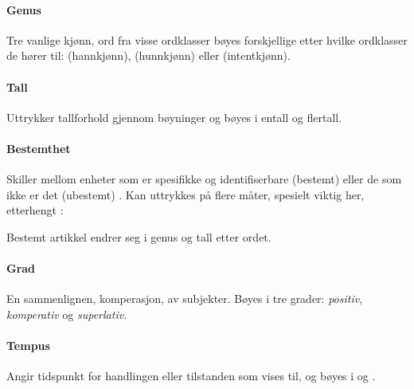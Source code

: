 \paragraph{Genus} Tre vanlige kjønn, ord fra visse ordklasser bøyes forskjellige etter hvilke ordklasser de hører til:  (hannkjønn),  (hunnkjønn) eller  (intentkjønn).

\paragraph{Tall} Uttrykker tallforhold gjennom bøyninger og bøyes i entall og flertall.

\newline
{}\newline

\paragraph{Bestemthet} Skiller mellom enheter som er spesifikke og identifiserbare (bestemt) eller de som ikke er det (ubestemt) \cite{wiki-bestemthet}. Kan uttrykkes på flere måter, spesielt viktig her, etterhengt :

\newline
{}\newline

Bestemt artikkel endrer seg i genus og tall etter ordet.

\newline
{}\newline

\paragraph{Grad} En sammenlignen, komperasjon, av subjekter. Bøyes i tre grader: \textit{positiv}, \textit{komperativ} og \textit{superlativ}.

\newline
{}\newline
{}

\paragraph{Tempus} Angir tidspunkt for handlingen eller tilstanden som vises til, og bøyes i  og .


